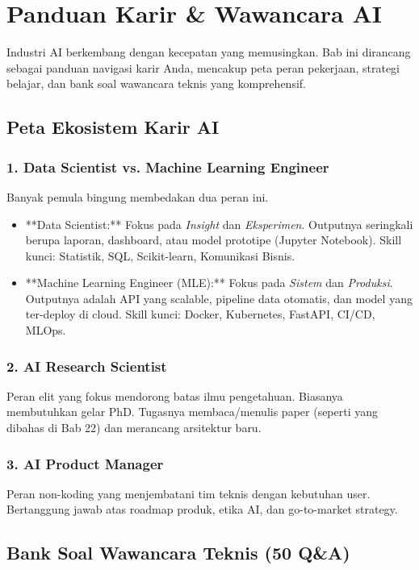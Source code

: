 \chapter{Panduan Karir \& Wawancara AI}
\label{chap:career_guide}

Industri AI berkembang dengan kecepatan yang memusingkan. Bab ini dirancang sebagai panduan navigasi karir Anda, mencakup peta peran pekerjaan, strategi belajar, dan bank soal wawancara teknis yang komprehensif.

\section{Peta Ekosistem Karir AI}

\subsection{1. Data Scientist vs. Machine Learning Engineer}
Banyak pemula bingung membedakan dua peran ini.
\begin{itemize}
    \item **Data Scientist:** Fokus pada \textit{Insight} dan \textit{Eksperimen}. Outputnya seringkali berupa laporan, dashboard, atau model prototipe (Jupyter Notebook). Skill kunci: Statistik, SQL, Scikit-learn, Komunikasi Bisnis.
    \item **Machine Learning Engineer (MLE):** Fokus pada \textit{Sistem} dan \textit{Produksi}. Outputnya adalah API yang scalable, pipeline data otomatis, dan model yang ter-deploy di cloud. Skill kunci: Docker, Kubernetes, FastAPI, CI/CD, MLOps.
\end{itemize}

\subsection{2. AI Research Scientist}
Peran elit yang fokus mendorong batas ilmu pengetahuan. Biasanya membutuhkan gelar PhD. Tugasnya membaca/menulis paper (seperti yang dibahas di Bab 22) dan merancang arsitektur baru.

\subsection{3. AI Product Manager}
Peran non-koding yang menjembatani tim teknis dengan kebutuhan user. Bertanggung jawab atas roadmap produk, etika AI, dan go-to-market strategy.

\section{Bank Soal Wawancara Teknis (50 Q\&A)}

